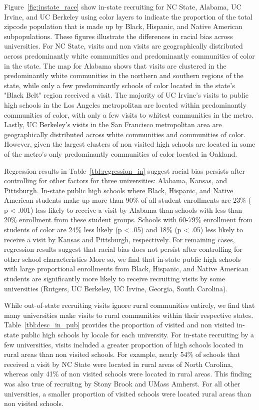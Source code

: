 \documentclass[twoside]{article}
\begin{document}
Figure~\ref{fig:instate_race} show in-state recruiting for NC State, Alabama, UC Irvine, and UC Berkeley using color layers to indicate the proportion of the total zipcode population that is made up by Black, Hispanic, and Native American subpopulations. These figures illustrate the differences in racial bias across universities. For NC State, visits and non visits are geographically distributed across predominantly white communities and predominantly communities of color in the state. The map for Alabama shows that visits are clustered in the predominantly white communities in the northern and southern regions of the state, while only a few predominantly schools of color located in the state's "Black Belt" region received a visit. The majority of UC Irvine's visits to public high schools in the Los Angeles metropolitan are located within predominantly communities of color, with only a few visits to whitest communities in the metro. Lastly, UC Berkeley's visits in the San Francisco metropolitan area are geographically distributed across white communities and communities of color. However, given  the largest clusters of non visited high schools are located in some of the metro's only predominantly communities of color located in Oakland.

Regression results in Table~\ref{tbl:regression_in} suggest racial bias persists after controlling for other factors for three universities: Alabama, Kansas, and Pittsburgh. In-state public high schools where Black, Hispanic, and Native American students make up more than  90\% of all student enrollments are 23\% ( p < .001) less likely to receive a visit by Alabama than schools with less than 20\% enrollment from these student groups. Schools with 60-79\% enrollment from students of color are 24\% less likely (p < .05) and 18\% (p < .05) less likely to receive a visit by Kansas and Pittsburgh, respectively. For remaining cases, regression results suggest that racial bias does not persist after controlling for other school characteristics More so, we find that in-state public high schools with large proportional enrollments from Black, Hispanic, and Native American students are significantly more likely to receive recruiting visits by some universities (Rutgers, UC Berkeley, UC Irvine, Georgia, South Carolina).

While out-of-state recruiting visits ignore rural communities entirely, we find that many universities make visits to rural communities within their respective states. Table~\ref{tbl:desc_in_pub} provides the proportion of visited and non visited in-state public high schools by locale for each university. For in-state recruiting by a few universities, visits included a greater proportion of high schools located in rural areas than non visited schools. For example, nearly 54\% of schools that received a visit by NC State were located in rural areas of North Carolina, whereas only 41\% of non visited schools were located in rural areas. This finding was also true of recruitng by Stony Brook and UMass Amherst. For all other universities, a smaller proportion of visited schools were located rural areas than non visited schools.
\end{document}
